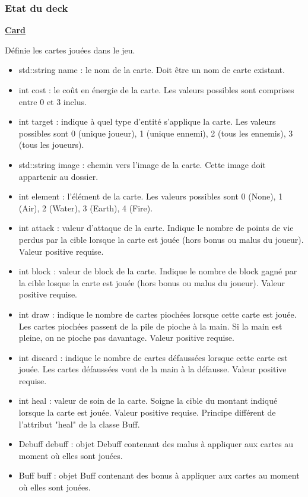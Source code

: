 \subsubsection{Etat du deck}
\underline{\textbf{Card}}
\par Définie les cartes jouées dans le jeu.
\begin{itemize}
    \item std::string name : le nom de la carte. Doit être un nom de carte existant.
    \item int cost : le coût en énergie de la carte. Les valeurs possibles sont comprises entre 0 et 3 inclus. 
    \item int target : indique à quel type d'entité s'applique la carte. Les valeurs possibles sont 0 (unique joueur), 1 (unique ennemi), 2 (tous les ennemis), 3 (tous les joueurs).
    \item std::string image : chemin vers l'image de la carte. Cette image doit appartenir au dossier.
    \item int element : l'élément de la carte. Les valeurs possibles sont 0 (None), 1 (Air), 2 (Water), 3 (Earth), 4 (Fire). 
    \item int attack : valeur d'attaque de la carte. Indique le nombre de points de vie perdus par la cible lorsque la carte est jouée (hors bonus ou malus du joueur). Valeur positive requise.
    \item int block : valeur de block de la carte. Indique le nombre de block gagné par la cible losque la carte est jouée (hors bonus ou malus du joueur). Valeur positive requise. 
    \item int draw : indique le nombre de cartes piochées lorsque cette carte est jouée. Les cartes piochées passent de la pile de pioche à la main. Si la main est pleine, on ne pioche pas davantage. Valeur positive requise.
    \item int discard : indique le nombre de cartes défaussées lorsque cette carte est jouée. Les cartes défaussées vont de la main à la défausse. Valeur positive requise.
    \item int heal : valeur de soin de la carte. Soigne la cible du montant indiqué lorsque la carte est jouée. Valeur positive requise. Principe différent de l'attribut "heal" de la classe Buff.
    \item Debuff debuff : objet Debuff contenant des malus à appliquer aux cartes au moment où elles sont jouées.
    \item Buff buff : objet Buff contenant des bonus à appliquer aux cartes au moment où elles sont jouées.
\end{itemize}

